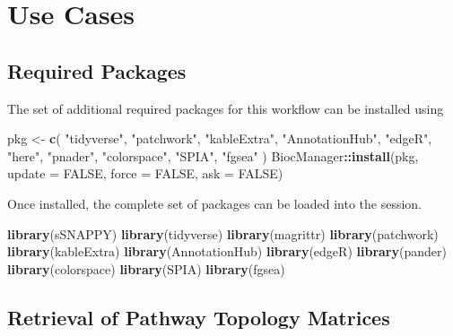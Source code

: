 \documentclass[9pt,a4paper,]{extarticle}
\newenvironment{Shaded}{\begin{snugshade}}{\end{snugshade}}
\newcommand{\AttributeTok}[1]{\textcolor[rgb]{0.13,0.29,0.53}{#1}}
\newcommand{\ConstantTok}[1]{\textcolor[rgb]{0.56,0.35,0.01}{#1}}
\newcommand{\FunctionTok}[1]{\textcolor[rgb]{0.13,0.29,0.53}{\textbf{#1}}}
\newcommand{\NormalTok}[1]{#1}
\newcommand{\OtherTok}[1]{\textcolor[rgb]{0.56,0.35,0.01}{#1}}
\newcommand{\SpecialCharTok}[1]{\textcolor[rgb]{0.81,0.36,0.00}{\textbf{#1}}}
\newcommand{\StringTok}[1]{\textcolor[rgb]{0.31,0.60,0.02}{#1}}
\begin{document}
\hypertarget{use-cases}{%
\section{Use Cases}\label{use-cases}}

\hypertarget{required-packages}{%
\subsection{Required Packages}\label{required-packages}}

The set of additional required packages for this workflow can be installed using

\begin{Shaded}
\begin{Highlighting}[]
\NormalTok{pkg }\OtherTok{\textless{}{-}} \FunctionTok{c}\NormalTok{(}
  \StringTok{"tidyverse"}\NormalTok{, }\StringTok{"patchwork"}\NormalTok{, }\StringTok{"kableExtra"}\NormalTok{, }\StringTok{"AnnotationHub"}\NormalTok{, }\StringTok{"edgeR"}\NormalTok{, }\StringTok{"here"}\NormalTok{, }
  \StringTok{"pnader"}\NormalTok{, }\StringTok{"colorspace"}\NormalTok{, }\StringTok{"SPIA"}\NormalTok{, }\StringTok{"fgsea"}
\NormalTok{)}
\NormalTok{BiocManager}\SpecialCharTok{::}\FunctionTok{install}\NormalTok{(pkg, }\AttributeTok{update =} \ConstantTok{FALSE}\NormalTok{, }\AttributeTok{force =} \ConstantTok{FALSE}\NormalTok{, }\AttributeTok{ask =} \ConstantTok{FALSE}\NormalTok{)}
\end{Highlighting}
\end{Shaded}

Once installed, the complete set of packages can be loaded into the session.

\begin{Shaded}
\begin{Highlighting}[]
\FunctionTok{library}\NormalTok{(sSNAPPY)}
\FunctionTok{library}\NormalTok{(tidyverse)}
\FunctionTok{library}\NormalTok{(magrittr)}
\FunctionTok{library}\NormalTok{(patchwork)}
\FunctionTok{library}\NormalTok{(kableExtra)}
\FunctionTok{library}\NormalTok{(AnnotationHub) }
\FunctionTok{library}\NormalTok{(edgeR)}
\FunctionTok{library}\NormalTok{(pander)}
\FunctionTok{library}\NormalTok{(colorspace)}
\FunctionTok{library}\NormalTok{(SPIA)}
\FunctionTok{library}\NormalTok{(fgsea)}
\end{Highlighting}
\end{Shaded}

\hypertarget{retrieval-of-pathway-topology-matrices}{%
\subsection{Retrieval of Pathway Topology Matrices}\label{retrieval-of-pathway-topology-matrices}}
\end{document}
